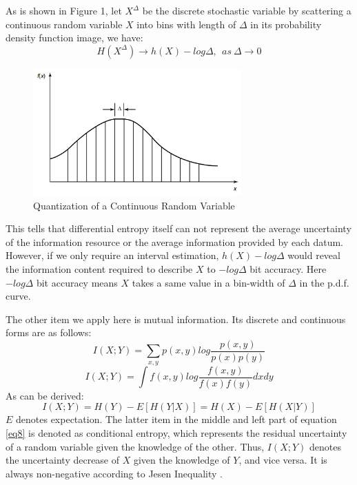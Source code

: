 \documentclass[11pt]{article}
\begin{document}
As is shown in Figure 1, let $X^\Delta$ be the discrete stochastic variable by scattering a continuous random variable $X$ into bins with length of $\Delta$ in its probability density function image, we have:
\begin{equation}\label{correct}
H(X^\Delta)\to h(X)-log\Delta,~~as ~\Delta \to 0
\end{equation}
\begin{figure}[H]
\centering
\includegraphics[width=8cm]{Quantization.png}
\caption{Quantization of a Continuous Random Variable}%
\end{figure}
This tells that differential entropy itself can not represent the average uncertainty of the information resource or the average information provided by each datum. However, if we only require an interval estimation, $h(X)-log\Delta $ would reveal the information content required to describe $X$ to $ -log\Delta$ bit accuracy\cite{cover2012elements}.  Here $ -log\Delta$ bit accuracy means $X$ takes a same value in a bin-width of $\Delta$ in the p.d.f. curve. 

The other item we apply here is mutual information. Its discrete and continuous forms are as follows:
\begin{equation}
I(X;Y)=\sum_{x,y}p(x,y)log\frac{p(x,y)}{p(x)p(y)}
\end{equation}
\begin{equation}
I(X;Y)=\int f(x,y)log\frac{f(x,y)}{f(x)f(y)}dxdy
\end{equation}
As can be derived:
\begin{equation}\label{eq8}
I(X;Y)=H(Y)-E[H(Y|X)]=H(X)-E[H(X|Y)]
\end{equation}
$E$ denotes expectation. The latter item in the middle and left part of equation \eqref{eq8} is denoted as conditional entropy, which represents the residual uncertainty of a random variable given the knowledge of the other. Thus,
$I(X;Y)$ denotes %
the uncertainty decrease of $X$ given the knowledge of $Y$, and vice versa. It is always non-negative according to  Jesen Inequality \cite{cover2012elements}.
\end{document}

